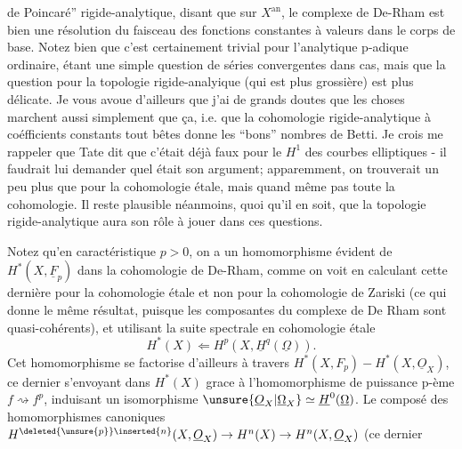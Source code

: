de Poincaré'' rigide-analytique, disant que sur $X^{\mathrm{an}}$, le complexe de De-Rham est bien une résolution du faisceau des fonctions constantes à valeurs dans le corps de base. Notez bien que c'est certainement trivial pour l'analytique p-adique ordinaire, étant une simple question de séries convergentes dans  cas, mais que la question pour la topologie rigide-analyique (qui est  plus grossière) est plus délicate. Je vous avoue d'ailleurs que j'ai de grands doutes que les choses marchent aussi simplement que ça, i.e. que la cohomologie rigide-analytique à coéfficients constants tout bêtes donne les ``bons'' nombres de Betti. Je crois me rappeler que Tate  dit que c'était déjà faux pour le $H^1$ des courbes elliptiques - il faudrait lui demander quel était son argument; apparemment, on trouverait un peu plus que pour la cohomologie étale, mais quand même pas toute la cohomologie. Il reste plausible néanmoins, quoi qu'il en soit, que la topologie rigide-analytique aura son rôle à jouer dans ces questions.

Notez qu'en caractéristique $p>0$, on a un homomorphisme évident de $H^*(X,\underline F_p)$ dans la cohomologie de De-Rham, comme on voit en calculant cette dernière pour la cohomologie étale et non pour la cohomologie de Zariski (ce qui donne le même résultat, puisque les composantes du complexe de De Rham sont quasi-cohérents), et utilisant la suite spectrale en cohomologie étale
\[
H^*(X)\Longleftarrow H^p(X,\underline H^q(\underline\Omega)).
\]
Cet homomorphisme se factorise d'ailleurs à travers $H^*(X,F_p)-H^*(X,\underline O_X)$, ce dernier s'envoyant dans $H^*(X)$ grace à l'homomorphisme de puissance p-ème $f\rightsquigarrow f^p$, induisant un isomorphisme $\unsure{\underline O_X|\underline\Omega_X}\simeq\underline H^0(\underline\Omega)$. Le composé des homomorphismes canoniques $H^{\deleted{\unsure{p}}\inserted{n}}(X,\underline O_X)\to H^n(X)\to H^n(X,\underline O_X)$ (ce dernier
